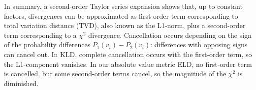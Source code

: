 {In summary, a second-order Taylor series expansion shows that, up to constant factors, divergences can be approximated as first-order term corresponding to total variation distance (TVD), also known as the L1-norm, plus a second-order term corresponding to a $\chi^{2}$ divergence. Cancellation occurs depending on the sign of the probability differences $P_1(v_i) - P_2(v_i)$: differences with opposing signs can cancel out. In KLD, complete cancellation occurs with the first-order term, so the L1-component vanishes. In our absolute value metric ELD, no first-order term is cancelled, but some second-order terms cancel, so the magnitude of the $\chi^{2}$ is diminished. 


%
%
%




%
%				
%				
%				
				
}
